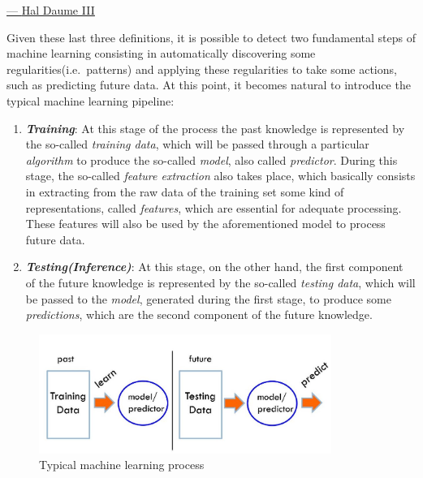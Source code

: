 \hspace{325pt}
\href{http://users.umiacs.umd.edu/~hal/}{--- \underline{Hal Daume III}}

\vspace{10mm}

Given these last three definitions, it is possible to detect two
fundamental steps of machine learning consisting in automatically
discovering some regularities(i.e.\ patterns) and applying these
regularities to take some actions, such as predicting future data. At
this point, it becomes natural to introduce the typical machine learning
pipeline:

\begin{enumerate}
    \item \emph{\textbf{Training}}: At this stage of the process the
          past knowledge is represented by the so-called \emph{training data},
          which will be passed through a particular \emph{algorithm}
          to produce the so-called \emph{model}, also called
          \emph{predictor}. During this stage, the so-called
          \emph{feature extraction} also takes place, which basically
          consists in extracting from the raw data of the training
          set some kind of representations, called \emph{features},
          which are essential for adequate processing. These features
          will also be used by the aforementioned model to process
          future data.
    \item \emph{\textbf{Testing(Inference)}}: At this stage, on the
          other hand, the first component of the future knowledge is
          represented by the so-called \emph{testing data}, which will
          be passed to the \emph{model}, generated during the first stage,
          to produce some \emph{predictions}, which are the second component
          of the future knowledge.
\end{enumerate}


\begin{figure}[h]
    \centering
    \includegraphics[width=0.85\textwidth]{../img/Typical_ML_process}
    \caption{Typical machine learning process}
\end{figure}

